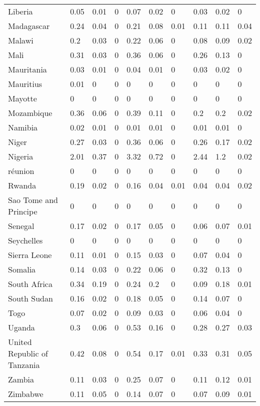 \begin{longtable}[t]{llllllllll}
Liberia & 0.05 & 0.01 & 0 & 0.07 & 0.02 & 0 & 0.03 & 0.02 & 0\\
Madagascar & 0.24 & 0.04 & 0 & 0.21 & 0.08 & 0.01 & 0.11 & 0.11 & 0.04\\
Malawi & 0.2 & 0.03 & 0 & 0.22 & 0.06 & 0 & 0.08 & 0.09 & 0.02\\
Mali & 0.31 & 0.03 & 0 & 0.36 & 0.06 & 0 & 0.26 & 0.13 & 0\\
Mauritania & 0.03 & 0.01 & 0 & 0.04 & 0.01 & 0 & 0.03 & 0.02 & 0\\
Mauritius & 0.01 & 0 & 0 & 0 & 0 & 0 & 0 & 0 & 0\\
Mayotte & 0 & 0 & 0 & 0 & 0 & 0 & 0 & 0 & 0\\
Mozambique & 0.36 & 0.06 & 0 & 0.39 & 0.11 & 0 & 0.2 & 0.2 & 0.02\\
Namibia & 0.02 & 0.01 & 0 & 0.01 & 0.01 & 0 & 0.01 & 0.01 & 0\\
Niger & 0.27 & 0.03 & 0 & 0.36 & 0.06 & 0 & 0.26 & 0.17 & 0.02\\
Nigeria & 2.01 & 0.37 & 0 & 3.32 & 0.72 & 0 & 2.44 & 1.2 & 0.02\\
réunion & 0 & 0 & 0 & 0 & 0 & 0 & 0 & 0 & 0\\
Rwanda & 0.19 & 0.02 & 0 & 0.16 & 0.04 & 0.01 & 0.04 & 0.04 & 0.02\\
Sao Tome and Principe & 0 & 0 & 0 & 0 & 0 & 0 & 0 & 0 & 0\\
Senegal & 0.17 & 0.02 & 0 & 0.17 & 0.05 & 0 & 0.06 & 0.07 & 0.01\\
Seychelles & 0 & 0 & 0 & 0 & 0 & 0 & 0 & 0 & 0\\
Sierra Leone & 0.11 & 0.01 & 0 & 0.15 & 0.03 & 0 & 0.07 & 0.04 & 0\\
Somalia & 0.14 & 0.03 & 0 & 0.22 & 0.06 & 0 & 0.32 & 0.13 & 0\\
South Africa & 0.34 & 0.19 & 0 & 0.24 & 0.2 & 0 & 0.09 & 0.18 & 0.01\\
South Sudan & 0.16 & 0.02 & 0 & 0.18 & 0.05 & 0 & 0.14 & 0.07 & 0\\
Togo & 0.07 & 0.02 & 0 & 0.09 & 0.03 & 0 & 0.06 & 0.04 & 0\\
Uganda & 0.3 & 0.06 & 0 & 0.53 & 0.16 & 0 & 0.28 & 0.27 & 0.03\\
United Republic of Tanzania & 0.42 & 0.08 & 0 & 0.54 & 0.17 & 0.01 & 0.33 & 0.31 & 0.05\\
Zambia & 0.11 & 0.03 & 0 & 0.25 & 0.07 & 0 & 0.11 & 0.12 & 0.01\\
Zimbabwe & 0.11 & 0.05 & 0 & 0.14 & 0.07 & 0 & 0.07 & 0.09 & 0.01\\*
\end{longtable}
\endgroup{}
